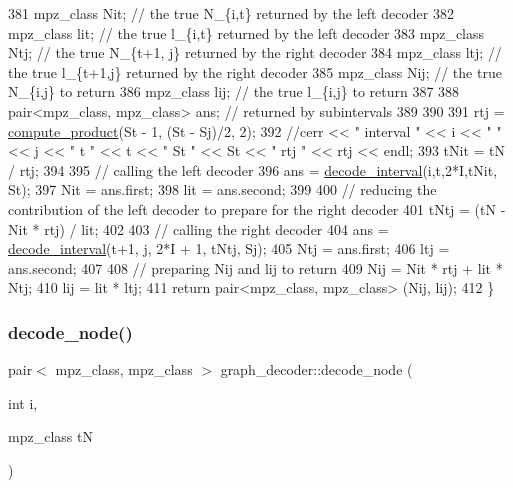 \begin{DoxyCode}
381   mpz\_class Nit; \textcolor{comment}{// the true N\_\{i,t\} returned by the left decoder}
382   mpz\_class lit; \textcolor{comment}{// the true l\_\{i,t\} returned by the left decoder}
383   mpz\_class Ntj; \textcolor{comment}{// the true N\_\{t+1, j\} returned by the right decoder}
384   mpz\_class ltj; \textcolor{comment}{// the true l\_\{t+1,j\} returned by the right decoder}
385   mpz\_class Nij; \textcolor{comment}{// the true N\_\{i,j\} to return}
386   mpz\_class lij; \textcolor{comment}{// the true l\_\{i,j\} to return}
387 
388   pair<mpz\_class, mpz\_class> ans; \textcolor{comment}{// returned by subintervals }
389 
390 
391   rtj = \hyperlink{compression__helper_8cpp_ae2afb43aabe50f7d42aae8f82b5a35f4}{compute\_product}(St - 1, (St - Sj)/2, 2);
392   \textcolor{comment}{//cerr << " interval " << i << " " << j << " t " << t << " St " << St << " rtj " << rtj << endl;}
393   tNit = tN / rtj;
394 
395   \textcolor{comment}{// calling the left decoder }
396   ans = \hyperlink{classgraph__decoder_a2cb0bd279889a833d4c825e99eb72410}{decode\_interval}(i,t,2*I,tNit, St); 
397   Nit = ans.first;
398   lit = ans.second;
399 
400   \textcolor{comment}{// reducing the contribution of the left decoder to prepare for the right decoder}
401   tNtj = (tN - Nit * rtj) / lit;
402 
403   \textcolor{comment}{// calling the right decoder}
404   ans = \hyperlink{classgraph__decoder_a2cb0bd279889a833d4c825e99eb72410}{decode\_interval}(t+1, j, 2*I + 1, tNtj, Sj);
405   Ntj = ans.first;
406   ltj = ans.second;
407 
408   \textcolor{comment}{// preparing Nij and lij to return}
409   Nij = Nit * rtj + lit * Ntj;
410   lij = lit * ltj;
411   \textcolor{keywordflow}{return} pair<mpz\_class, mpz\_class> (Nij, lij);
412 \}
\end{DoxyCode}
\mbox{\label{classgraph__decoder_af3ff99a4de6035ad257ebd7c6519cdd8}} 
\subsubsection{\texorpdfstring{decode\+\_\+node()}{decode\_node()}}
{\footnotesize\ttfamily pair$<$ mpz\+\_\+class, mpz\+\_\+class $>$ graph\+\_\+decoder\+::decode\+\_\+node (\begin{DoxyParamCaption}\item[{int}]{i,  }\item[{mpz\+\_\+class}]{tN }\end{DoxyParamCaption})}




